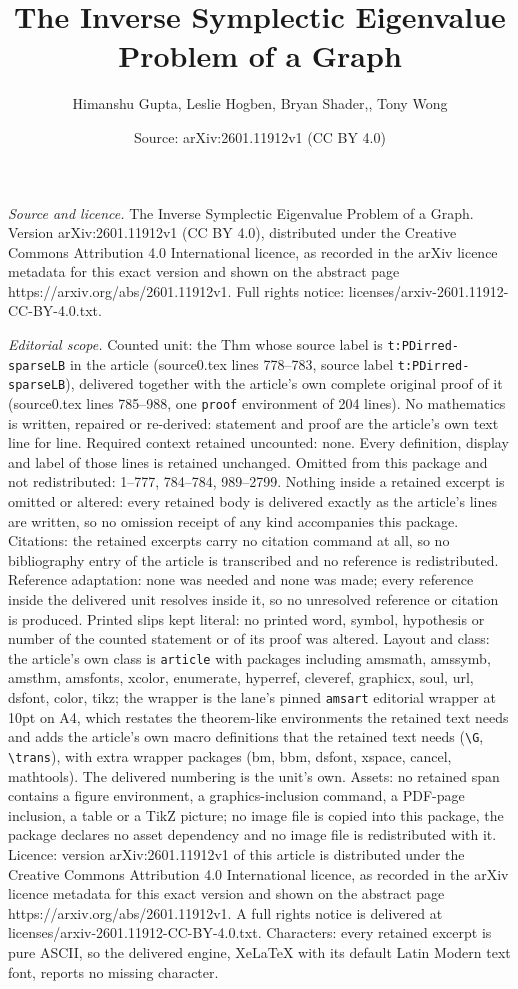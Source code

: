 \documentclass[10pt,a4paper]{amsart}
\title[The Inverse Symplectic Eigenvalue Problem of a Graph]{The Inverse Symplectic Eigenvalue Problem of a Graph}
\author{Himanshu Gupta, Leslie Hogben, Bryan Shader,, Tony Wong}
\date{Source: arXiv:2601.11912v1 (CC BY 4.0)}
\begin{document}
\maketitle

\noindent\emph{Source and licence.} The Inverse Symplectic Eigenvalue Problem of a Graph. Version arXiv:2601.11912v1 (CC BY 4.0), distributed under the Creative Commons Attribution 4.0 International licence, as recorded in the arXiv licence metadata for this exact version and shown on the abstract page https://arxiv.org/abs/2601.11912v1. Full rights notice: licenses/arxiv-2601.11912-CC-BY-4.0.txt.\par\smallskip

\noindent\textit{Editorial scope.} Counted unit: the Thm whose source label is \texttt{t:PDirred-sparseLB} in the article (source0.tex lines 778--783, source label \texttt{t:PDirred-sparseLB}), delivered together with the article's own complete original proof of it (source0.tex lines 785--988, one \texttt{proof} environment of 204 lines). No mathematics is written, repaired or re-derived: statement and proof are the article's own text line for line. Required context retained uncounted: none. Every definition, display and label of those lines is retained unchanged. Omitted from this package and not redistributed: 1--777, 784--784, 989--2799. Nothing inside a retained excerpt is omitted or altered: every retained body is delivered exactly as the article's lines are written, so no omission receipt of any kind accompanies this package. Citations: the retained excerpts carry no citation command at all, so no bibliography entry of the article is transcribed and no reference is redistributed. Reference adaptation: none was needed and none was made; every reference inside the delivered unit resolves inside it, so no unresolved reference or citation is produced. Printed slips kept literal: no printed word, symbol, hypothesis or number of the counted statement or of its proof was altered. Layout and class: the article's own class is \texttt{article} with packages including amsmath, amssymb, amsthm, amsfonts, xcolor, enumerate, hyperref, cleveref, graphicx, soul, url, dsfont, color, tikz; the wrapper is the lane's pinned \texttt{amsart} editorial wrapper at 10pt on A4, which restates the theorem-like environments the retained text needs and adds the article's own macro definitions that the retained text needs (\texttt{\textbackslash G}, \texttt{\textbackslash trans}), with extra wrapper packages (bm, bbm, dsfont, xspace, cancel, mathtools). The delivered numbering is the unit's own. Assets: no retained span contains a figure environment, a graphics-inclusion command, a PDF-page inclusion, a table or a TikZ picture; no image file is copied into this package, the package declares no asset dependency and no image file is redistributed with it. Licence: version arXiv:2601.11912v1 of this article is distributed under the Creative Commons Attribution 4.0 International licence, as recorded in the arXiv licence metadata for this exact version and shown on the abstract page https://arxiv.org/abs/2601.11912v1. A full rights notice is delivered at licenses/arxiv-2601.11912-CC-BY-4.0.txt. Characters: every retained excerpt is pure ASCII, so the delivered engine, XeLaTeX with its default Latin Modern text font, reports no missing character.
\end{document}
